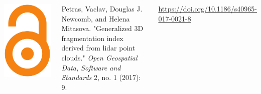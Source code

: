 \documentclass[25pt, margin=0mm, innermargin=15mm, blockverticalspace=15mm, colspace=15mm, subcolspace=8mm]{tikzposter}
\begin{document}
\begin{columns}
{%

\smallskip

\begingroup

\begin{minipage}{\listlogowidth}
\centering
\includegraphics[width=0.9\linewidth]{open_access}
\end{minipage}
\listhspace
\begin{minipage}{\listtextwidth}
Petras, Vaclav, Douglas J. Newcomb, and Helena Mitasova.
"Generalized 3D fragmentation index derived from lidar point clouds."
\textit{Open Geospatial Data, Software and Standards}
2, no. 1 (2017): 9.

\url{https://doi.org/10.1186/s40965-017-0021-8}
\end{minipage}

}
\end{columns}
\end{document}
